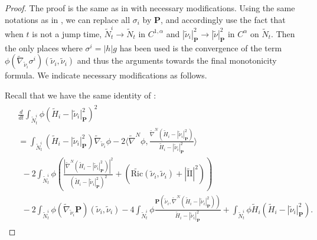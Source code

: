 \documentclass[10pt,a4paper]{amsart}
\begin{document}
\begin{proof}
	The proof is the same as in \cite[Section 6]{Dong26SigmaIMCF} with necessary modifications.
Using the same notations as in \cite[Section 6]{Dong26SigmaIMCF}, we can replace all $\sigma _i$ by $\mathbf{P}$, and accordingly use the fact that when $t$ is not a jump time, $\tilde{N}_t ^{i} \to \tilde{N}_t$ in $C^{1,\alpha }$ and $|\tilde{\nu }_i|^2_{\mathbf{P}} \to |\tilde{\nu }|^2_{\mathbf{P}}$ in $C^{\alpha }$ on $\tilde{N}_t$. Then the only places where $\sigma ^{i} = |h| g$ has been used is the convergence of the term $\phi (\tilde{\nabla }_{\tilde{\nu }_i} \sigma ^{i})(\tilde{\nu }_i, \tilde{\nu }_i)$ and thus the arguments towards the final monotonicity formula. We indicate necessary modifications as follows.


	Recall that we have the same identity of \cite[Equation (30)]{Dong26SigmaIMCF}:
\begin{align}\label{ddt-identity-i}
	\begin{split}
		&\frac{d}{d t} \int_{\tilde{N}^{i}_t} \phi (\tilde{H}_{i}- |\tilde{\nu}_{i} |^2_{\mathbf{P} })^2 \\							&= \int_{\tilde{N}^{i}_t} (\tilde{H}_{i}-|\tilde{\nu}_i |^2_{ \mathbf{P}}) \tilde{\nabla} _{\tilde{\nu}_i }\phi -2 \langle \tilde{\nabla} ^{N} \phi , \frac{\tilde{\nabla} ^{N}(\tilde{H}_i-|\tilde{\nu}_i |^2_{\mathbf{P}})}{\tilde{H}_i- |\tilde{\nu}_i |^2_{\mathbf{P} }} \rangle \\
		&\ \ - 2 \int_{\tilde{N}^{i}_t}\phi \left(   \frac{|\tilde{\nabla} ^{N} (\tilde{H}_i-|\tilde{\nu}_i |^2_{ \mathbf{P}})|^2}{(\tilde{H}_i-|\tilde{\nu}_i |^2_{\mathbf{P} })^2} + \left( \tilde{\mathrm{Ric}}(\tilde{\nu}_i ,\tilde{\nu}_i ) +|\tilde{\mathrm{II}}|^2 \right) \right) \\
		&\ \ -2 \int_{\tilde{N}^{i}_t} \phi (\tilde{\nabla} _{\tilde{\nu}_i } \mathbf{P}) (\tilde{\nu}_i , \tilde{\nu}_i ) - 4 \int_{\tilde{N}^i_t} \phi \frac{\mathbf{P}( \tilde{\nu}_i , \tilde{\nabla} ^{N}(\tilde{H}_i- |\tilde{\nu}_i |^2_{\mathbf{P} }) )}{\tilde{H}_i- |\tilde{\nu}_i |^2_{\mathbf{P}}} + \int_{\tilde{N}^{i}_t}\phi \tilde{H}_i(\tilde{H}_i-|\tilde{\nu}_i |^2_{\mathbf{P} }).
	\end{split}
\end{align}


\end{proof}
\end{document}
